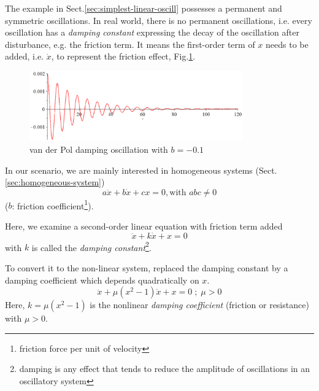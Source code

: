 The example in Sect.\ref{sec:simplest-linear-oscill} possesses a permanent and
symmetric oscillations. In real world, there is no permanent oscillations, i.e.
every oscillation has a {\it damping constant} expressing the decay of the
oscillation after disturbance, e.g. the friction term. %
It means the first-order term of $x$ needs to be added, i.e. $\dot{x}$, to
represent the friction effect, Fig.\ref{fig:van-der-Pol-damping-oscillation}.

\begin{figure}[hbt]
  \centerline{\includegraphics[height=3cm,
    angle=0]{./images/van-der-Pol-damping-oscillation.eps}}
\caption{van der Pol damping oscillation with $b = -0.1$}
\label{fig:van-der-Pol-damping-oscillation}
\end{figure}



\begin{framed}

In our scenario, we are mainly interested in homogeneous systems
(Sect.\ref{sec:homogeneous-system})
\begin{equation}
  \label{eq:371}
  a\ddot{x}+b\dot{x}+cx=0, \text{with } abc\ne 0
\end{equation}
($b$: friction
coefficient\footnote{friction force per unit of velocity}). 
\end{framed}

Here, we examine a second-order linear equation with friction term added
\begin{equation}
  \label{eq:78}
   \ddot{x}+k\dot{x}+x=0
\end{equation}
with $k$ is called the {\it damping constant}\footnote{damping is any
  effect that tends to reduce the amplitude of oscillations in an
  oscillatory system}. 

To convert it to the non-linear system, \citep{vanderPol1926} replaced the
damping constant by a damping coefficient which depends quadratically on $x$.
\begin{equation}
  \label{eq:372}
  \ddot{x} + \mu (x^2-1) \dot{x} + x = 0\; ; \; \mu>0
\end{equation}
Here, $k=\mu(x^2-1)$ is the nonlinear {\it damping coefficient} (friction
or resistance) with $\mu>0$. 

